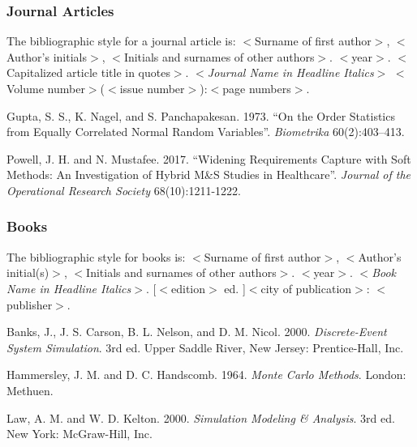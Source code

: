 \documentclass{wscpaperproc}
\theoremstyle{wsc}
\begin{document}

\subsubsection{Journal Articles}
The bibliographic style for a journal article is: 
$<$Surname of first author$>$, $<$Author's initials$>$,
$<$Initials and surnames of other authors$>$. $<$year$>$.
$<$Capitalized article title in quotes$>$. $<${\em Journal Name in
Headline Italics}$>$ $<$Volume number$>$($<$issue number$>$):$<$page numbers$>$.

{\footnotesize
\begin{hangref}
\item Gupta, S. S., K. Nagel, and S. Panchapakesan. 1973. ``On the Order Statistics from Equally Correlated Normal Random Variables''. \textit{Biometrika} 60(2):403–413.
\item Powell, J. H. and N. Mustafee. 2017. ``Widening Requirements Capture with Soft Methods: An Investigation of Hybrid M\&S Studies in Healthcare''. \textit{Journal of the Operational Research Society} 68(10):1211-1222.
\end{hangref}
}

\subsubsection{Books}
The bibliographic style for books is: 
$<$Surname of first author$>$, $<$Author’s initial(s)$>$, $<$Initials and surnames of other authors$>$. $<$year$>$. 
$<${\em Book Name in Headline Italics}$>$. [$<$edition$>$ ed. ]$<$city of publication$>$: $<$publisher$>$. 

{\footnotesize
\begin{hangref}
\item Banks, J., J. S. Carson, B. L. Nelson, and D. M. Nicol. 2000. \textit{Discrete-Event System Simulation}. 3rd ed. Upper Saddle River, New Jersey: Prentice-Hall, Inc.
\item Hammersley, J. M. and D. C. Handscomb. 1964. \textit{Monte Carlo Methods}. London: Methuen.
\item Law, A. M. and W. D. Kelton. 2000. \textit{Simulation Modeling \& Analysis}. 3rd ed. New York: McGraw-Hill, Inc.
\end{hangref}
}
\end{document}
